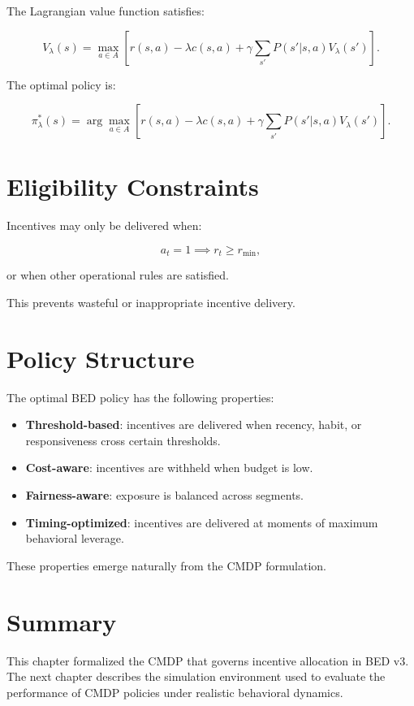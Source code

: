 The Lagrangian value function satisfies:


\[
V_{\lambda}(s) =
\max_{a \in A}
\left[
r(s,a) - \lambda c(s,a)
+ \gamma \sum_{s'} P(s'|s,a) V_{\lambda}(s')
\right].
\]



The optimal policy is:


\[
\pi_{\lambda}^{*}(s) =
\arg\max_{a \in A}
\left[
r(s,a) - \lambda c(s,a)
+ \gamma \sum_{s'} P(s'|s,a) V_{\lambda}(s')
\right].
\]



\section{Eligibility Constraints}

Incentives may only be delivered when:


\[
a_t = 1 \implies r_t \ge r_{\min},
\]


or when other operational rules are satisfied.

This prevents wasteful or inappropriate incentive delivery.

\section{Policy Structure}

The optimal BED policy has the following properties:

\begin{itemize}
    \item \textbf{Threshold-based}: incentives are delivered when recency,
    habit, or responsiveness cross certain thresholds.
    \item \textbf{Cost-aware}: incentives are withheld when budget is low.
    \item \textbf{Fairness-aware}: exposure is balanced across segments.
    \item \textbf{Timing-optimized}: incentives are delivered at moments of
    maximum behavioral leverage.
\end{itemize}

These properties emerge naturally from the CMDP formulation.

\section{Summary}

This chapter formalized the CMDP that governs incentive allocation in BED v3.
The next chapter describes the simulation environment used to evaluate the
performance of CMDP policies under realistic behavioral dynamics.
